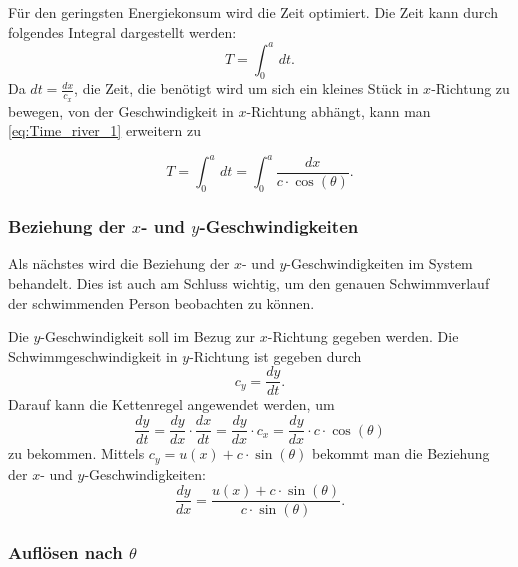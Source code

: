 Für den geringsten Energiekonsum wird die Zeit optimiert. Die Zeit kann durch folgendes Integral dargestellt werden:
\begin{equation}
    T = \int_0^a\,dt \label{eq:Time_river_1}.
\end{equation}
Da \(dt = \frac{dx}{c_x}\), die Zeit, die benötigt wird um sich ein
kleines Stück in \(x\)-Richtung zu bewegen, von der Geschwindigkeit
in \(x\)-Richtung abhängt, kann man \eqref{eq:Time_river_1} erweitern
zu

\begin{equation}
    T = \int_0^a\,dt = \int_0^a\frac{dx}{c\cdot \cos(\theta)} \label{eq:Time_river_2}.
\end{equation} 


\subsubsection{Beziehung der \(x\)- und \(y\)-Geschwindigkeiten}

Als nächstes wird die Beziehung der \(x\)- und \(y\)-Geschwindigkeiten
im System behandelt. Dies ist auch am Schluss wichtig, um den genauen
Schwimmverlauf der schwimmenden Person beobachten zu können.

Die \(y\)-Geschwindigkeit soll im Bezug zur \(x\)-Richtung gegeben
werden. Die Schwimmgeschwindigkeit in \(y\)-Richtung ist gegeben
durch
\begin{equation}
    c_y = \frac{dy}{dt}.
\end{equation}
Darauf kann die Kettenregel angewendet werden, um
\begin{equation}
    \frac{dy}{dt} = \frac{dy}{dx} \cdot \frac{dx}{dt} = \frac{dy}{dx}\cdot c_x = \frac{dy}{dx}\cdot c\cdot \cos(\theta)
\end{equation}
zu bekommen. Mittels \(c_y = u(x) + c\cdot \sin(\theta)\) bekommt man die Beziehung der \(x\)- und \(y\)-Geschwindigkeiten:
\begin{equation}
    \frac{dy}{dx} = \frac{u(x) + c \cdot \sin(\theta)}{c \cdot \sin(\theta)}. \label{eq:dy_dx}
\end{equation}



\subsubsection{Auflösen nach \(\theta\)}

